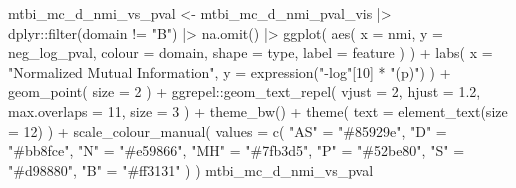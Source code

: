 \documentclass[
  letterpaper,
  DIV=11,
  numbers=noendperiod]{scrreprt}
\newenvironment{Shaded}{\begin{snugshade}}{\end{snugshade}}
\newcommand{\AttributeTok}[1]{\textcolor[rgb]{0.40,0.45,0.13}{#1}}
\newcommand{\DecValTok}[1]{\textcolor[rgb]{0.68,0.00,0.00}{#1}}
\newcommand{\FloatTok}[1]{\textcolor[rgb]{0.68,0.00,0.00}{#1}}
\newcommand{\FunctionTok}[1]{\textcolor[rgb]{0.28,0.35,0.67}{#1}}
\newcommand{\NormalTok}[1]{\textcolor[rgb]{0.00,0.23,0.31}{#1}}
\newcommand{\OtherTok}[1]{\textcolor[rgb]{0.00,0.23,0.31}{#1}}
\newcommand{\SpecialCharTok}[1]{\textcolor[rgb]{0.37,0.37,0.37}{#1}}
\newcommand{\StringTok}[1]{\textcolor[rgb]{0.13,0.47,0.30}{#1}}
\begin{document}
\begin{Shaded}
\begin{Highlighting}[]
\NormalTok{mtbi\_mc\_d\_nmi\_vs\_pval }\OtherTok{\textless{}{-}}\NormalTok{ mtbi\_mc\_d\_nmi\_pval\_vis }\SpecialCharTok{|\textgreater{}}
\NormalTok{    dplyr}\SpecialCharTok{::}\FunctionTok{filter}\NormalTok{(domain }\SpecialCharTok{!=} \StringTok{"B"}\NormalTok{) }\SpecialCharTok{|\textgreater{}}
    \FunctionTok{na.omit}\NormalTok{() }\SpecialCharTok{|\textgreater{}}
    \FunctionTok{ggplot}\NormalTok{(}
        \FunctionTok{aes}\NormalTok{(}
            \AttributeTok{x =}\NormalTok{ nmi,}
            \AttributeTok{y =}\NormalTok{ neg\_log\_pval,}
            \AttributeTok{colour =}\NormalTok{ domain,}
            \AttributeTok{shape =}\NormalTok{ type,}
            \AttributeTok{label =}\NormalTok{ feature}
\NormalTok{        )}
\NormalTok{    ) }\SpecialCharTok{+}
    \FunctionTok{labs}\NormalTok{(}
        \AttributeTok{x =} \StringTok{"Normalized Mutual Information"}\NormalTok{,}
        \AttributeTok{y =} \FunctionTok{expression}\NormalTok{(}\StringTok{"{-}log"}\NormalTok{[}\DecValTok{10}\NormalTok{] }\SpecialCharTok{*} \StringTok{"(p)"}\NormalTok{)}
\NormalTok{    ) }\SpecialCharTok{+}
    \FunctionTok{geom\_point}\NormalTok{(}
        \AttributeTok{size =} \DecValTok{2}
\NormalTok{    ) }\SpecialCharTok{+}
\NormalTok{    ggrepel}\SpecialCharTok{::}\FunctionTok{geom\_text\_repel}\NormalTok{(}
        \AttributeTok{vjust =} \DecValTok{2}\NormalTok{,}
        \AttributeTok{hjust =} \FloatTok{1.2}\NormalTok{,}
        \AttributeTok{max.overlaps =} \DecValTok{11}\NormalTok{,}
        \AttributeTok{size =} \DecValTok{3}
\NormalTok{    ) }\SpecialCharTok{+}
    \FunctionTok{theme\_bw}\NormalTok{() }\SpecialCharTok{+}
    \FunctionTok{theme}\NormalTok{(}
        \AttributeTok{text =} \FunctionTok{element\_text}\NormalTok{(}\AttributeTok{size =} \DecValTok{12}\NormalTok{)}
\NormalTok{    ) }\SpecialCharTok{+}
    \FunctionTok{scale\_colour\_manual}\NormalTok{(}
        \AttributeTok{values =} \FunctionTok{c}\NormalTok{(}
            \StringTok{"AS"} \OtherTok{=} \StringTok{"\#85929e"}\NormalTok{,}
            \StringTok{"D"} \OtherTok{=} \StringTok{"\#bb8fce"}\NormalTok{,}
            \StringTok{"N"} \OtherTok{=} \StringTok{"\#e59866"}\NormalTok{,}
            \StringTok{"MH"} \OtherTok{=} \StringTok{"\#7fb3d5"}\NormalTok{,}
            \StringTok{"P"} \OtherTok{=} \StringTok{"\#52be80"}\NormalTok{,}
            \StringTok{"S"} \OtherTok{=} \StringTok{"\#d98880"}\NormalTok{,}
            \StringTok{"B"} \OtherTok{=} \StringTok{"\#ff3131"}
\NormalTok{        )}
\NormalTok{    )}
\NormalTok{mtbi\_mc\_d\_nmi\_vs\_pval}


\end{Highlighting}
\end{Shaded}
\end{document}
